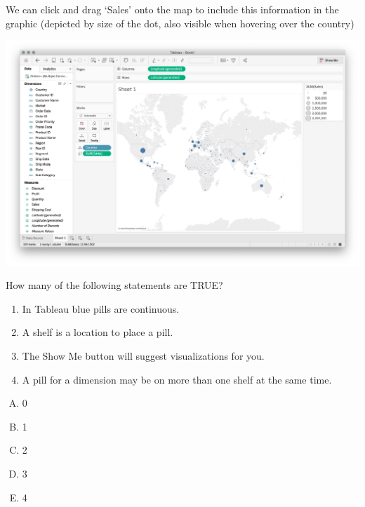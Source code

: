 \documentclass[xcolor=svgnames]{beamer} %
\begin{document}
\begin{frame}
We can click and drag `Sales' onto the map to include this information in the graphic (depicted by size of the dot, also visible when hovering over the country)
\begin{center}
\includegraphics[width=.95\textwidth]{img/sales3}
\end{center}
\end{frame}




\begin{frame}
\begin{example}
How many of the following statements are TRUE?
\begin{enumerate}
\item In Tableau blue pills are continuous. 
\item A shelf is a location to place a pill.
\item The Show Me button will suggest visualizations for you.
\item A pill for a dimension may be on more than one shelf at the same time.
\end{enumerate}
\begin{multicols}{5}
\begin{enumerate}[A)]
\item 0 
\item 1
\item 2
\item 3
\item 4
\end{enumerate}
\end{multicols}
\end{example}
\end{frame}
\end{document}
